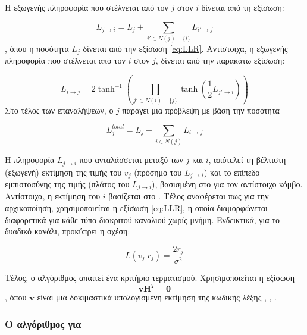 Η εξωγενής πληροφορία που στέλνεται από τον  $j$ στον  $i$ δίνεται από τη εξίσωση:

\begin{equation}
L_{j\to i} = L_j + \sum_{i'\in N(j)-\lbrace i\rbrace} L_{i'\to j}
\label{eq:CN update}
\end{equation}
, όπου η ποσότητα $L_j$ δίνεται από την εξίσωση \ref{eq:LLR}. Αντίστοιχα, η εξωγενής πληροφορία που στέλνεται από τον  $i$ στον  $j$, δίνεται από την παρακάτω εξίσωση:

\begin{equation}
L_{i\to j} = 2\tanh^{-1} \left( \prod_{j'\in N(i)-\lbrace j\rbrace} \tanh \left( \frac{1}{2}L_{j'\to i} \right)\right)
\label{eq:VN update}
\end{equation}
Στο τέλος των επαναλήψεων, ο  $j$ παράγει μια πρόβλεψη με βάση την ποσότητα

\begin{equation}
L_{j}^{total} = L_j + \sum_{i\in N(j)} L_{i\to j}
\label{eq:LLR total}
\end{equation}

Η πληροφορία $L_{j\to i}$ που ανταλάσσεται μεταξύ των  $j$ και  $i$, απότελεί τη βέλτιστη (εξωγενή) εκτίμηση της τιμής του $v_j$ (πρόσημο του $L_{j\to i}$) και το επίπεδο εμπιστοσύνης της τιμής (πλάτος του $L_{j\to i}$), βασισμένη στο  για τον αντίστοιχο κόμβο. Αντίστοιχα, η εκτίμηση του  $i$ βασίζεται στο . Τέλος αναφέρεται πως για την αρχικοποίηση, χρησιμοποιείται η εξίσωση \ref{eq:LLR}, η οποία διαμορφώνεται διαφορετικά για κάθε τύπο διακριτού καναλιού χωρίς μνήμη. Ενδεικτικά, για το δυαδικό  κανάλι, προκύπρει η σχέση:

\begin{equation}
L(v_j|r_j) = \frac{2r_j}{\sigma^2}
\label{eq:AWGN initial LLR}
\end{equation}

Τέλος, ο αλγόριθμος απαιτεί ένα κριτήριο τερματισμού. Χρησιμοποιείται η εξίσωση
\begin{equation*}
\mathbf{v}\mathbf{H}^T=\mathbf{0}
\end{equation*}
, όπου $\mathbf{v}$ είναι μια δοκιμαστικά υπολογισμένη εκτίμηση της κωδικής λέξης \cite{ryan2009channel}, \cite{johnson2009iterative}, \cite{ta2013tutorial}.

\subsubsection{Ο  αλγόριθμος για }

